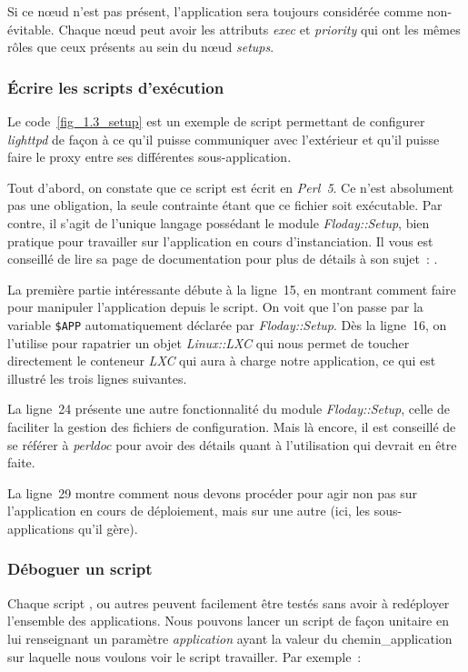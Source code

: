 Si ce nœud n'est pas présent, l'application sera toujours considérée comme non-évitable. Chaque nœud peut avoir les attributs \emph{exec} et \emph{priority} qui ont les mêmes rôles que ceux présents au sein du nœud \emph{setups}.

\subsubsection{Écrire les scripts d'exécution}

Le code~\ref{fig_1.3_setup} est un exemple de script permettant de configurer \emph{lighttpd} de façon à ce qu'il puisse communiquer avec l'extérieur et qu'il puisse faire le proxy entre ses différentes \gls{sous-application}.



Tout d'abord, on constate que ce script est écrit en \emph{Perl~5}.
Ce n'est absolument pas une obligation, la seule contrainte étant que ce fichier soit exécutable.
Par contre, il s'agit de l'unique langage possédant le module \emph{Floday::Setup}, bien pratique pour travailler sur l'\gls{application} en cours d'instanciation.
Il vous est conseillé de lire sa page de documentation pour plus de détails à son sujet~: .

La première partie intéressante débute à la ligne~15, en montrant comment faire pour manipuler l'application depuis le script.
On voit que l'on passe par la variable {\tt\$APP} automatiquement déclarée par \emph{Floday::Setup}.
Dès la ligne~16, on l'utilise pour rapatrier un objet \emph{Linux::LXC} qui nous permet de toucher directement le conteneur \emph{LXC} qui aura à charge notre application, ce qui est illustré les trois lignes suivantes.

La ligne~24 présente une autre fonctionnalité du module \emph{Floday::Setup}, celle de faciliter la gestion des fichiers de configuration.
Mais là encore, il est conseillé de se référer à \emph{perldoc} pour avoir des détails quant à l'utilisation qui devrait en être faite.

La ligne~29 montre comment nous devons procéder pour agir non pas sur l'application en cours de déploiement, mais sur une autre (ici, les \glspl{sous-application} qu'il gère).

\subsubsection{Déboguer un script}

Chaque script ,  ou autres peuvent facilement être testés sans avoir à redéployer l'ensemble des applications.
Nous pouvons lancer un script de façon unitaire en lui renseignant un paramètre \emph{application} ayant la valeur du \gls{chemin_application} sur laquelle nous voulons voir le script travailler.
Par exemple~:


